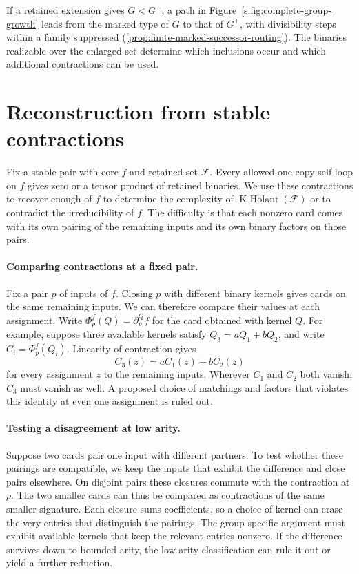 \documentclass[11pt,letterpaper,onecolumn]{article}
\theoremstyle{plain}
\theoremstyle{definition}
\theoremstyle{remark}
\newcommand{\cF}{\mathcal F}
\newcommand{\KHolant}{\operatorname{K\text{-}Holant}}
\begin{document}
If a retained extension gives \(G<G^+\), a path in
Figure~\ref{s:fig:complete-group-growth} leads from the marked type of
\(G\) to that of \(G^+\), with divisibility steps within a family
suppressed (\cref{prop:finite-marked-successor-routing}).
The binaries realizable over the enlarged set determine which inclusions
occur and which additional contractions can be used.

\section{Reconstruction from stable contractions}
\label{s:short:mechanism}
Fix a stable pair with core \(f\) and retained set \(\cF\). Every allowed one-copy self-loop on
\(f\) gives zero or a tensor product of retained binaries. We use these
contractions to recover enough of \(f\) to determine the complexity of \(\KHolant(\cF)\) or
to contradict the irreducibility of \(f\). The difficulty is that each
nonzero card comes with its own pairing of the remaining inputs and its
own binary factors on those pairs.

\paragraph{Comparing contractions at a fixed pair.}
Fix a pair \(p\) of inputs of \(f\). Closing \(p\) with different binary
kernels gives cards on the same remaining inputs. We can therefore
compare their values at each assignment. Write
\(\Phi_p^f(Q)=\partial_p^Q f\) for the card obtained with kernel \(Q\).
For example, suppose three available kernels satisfy \(Q_3=aQ_1+bQ_2\),
and write \(C_i=\Phi_p^f(Q_i)\). Linearity of contraction gives
\[
 C_3(z)=aC_1(z)+bC_2(z)
\]
for every assignment \(z\) to the remaining inputs. Wherever \(C_1\)
and \(C_2\) both vanish, \(C_3\) must vanish as well. A proposed choice
of matchings and factors that violates this identity at even one
assignment is ruled out.

\paragraph{Testing a disagreement at low arity.}
Suppose two cards pair one input with different partners. To test
whether these pairings are compatible, we keep the inputs that exhibit
the difference and close pairs elsewhere. On disjoint pairs these
closures commute with the contraction at \(p\). The two smaller cards
can thus be compared as contractions of the same smaller signature.
Each closure sums coefficients, so a choice of kernel can erase the
very entries that distinguish the pairings. The group-specific argument
must exhibit available kernels that keep the relevant entries nonzero.
If the difference survives down to bounded arity, the low-arity
classification can rule it out or yield a further reduction.
\end{document}
